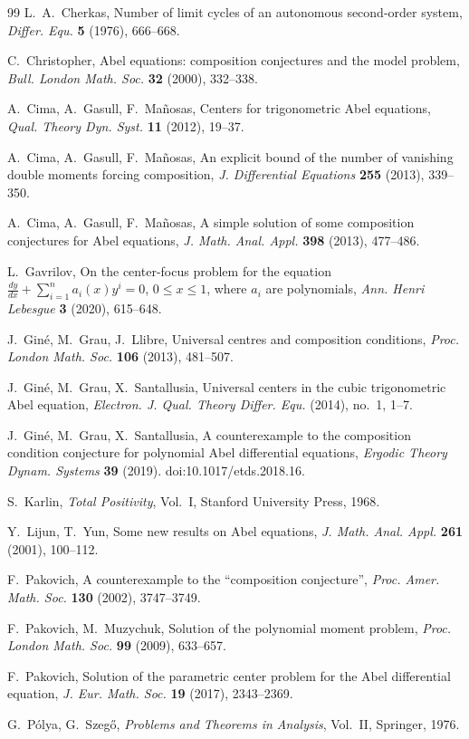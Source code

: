 \documentclass[11pt]{article}
\theoremstyle{plain}
\theoremstyle{definition}
\theoremstyle{remark}
\begin{document}
\begin{thebibliography}{99}
L.~A.~Cherkas,
Number of limit cycles of an autonomous second-order system,
\emph{Differ. Equ.} \textbf{5} (1976), 666--668.

C.~Christopher,
Abel equations: composition conjectures and the model problem,
\emph{Bull. London Math. Soc.} \textbf{32} (2000), 332--338.

A.~Cima, A.~Gasull, F.~Mañosas,
Centers for trigonometric Abel equations,
\emph{Qual. Theory Dyn. Syst.} \textbf{11} (2012), 19--37.

A.~Cima, A.~Gasull, F.~Mañosas,
An explicit bound of the number of vanishing double moments forcing composition,
\emph{J. Differential Equations} \textbf{255} (2013), 339--350.

A.~Cima, A.~Gasull, F.~Mañosas,
A simple solution of some composition conjectures for Abel equations,
\emph{J. Math. Anal. Appl.} \textbf{398} (2013), 477--486.

L.~Gavrilov,
On the center-focus problem for the equation
$\frac{dy}{dx}+\sum_{i=1}^n a_i(x)y^i=0$, $0\le x\le1$, where $a_i$ are polynomials,
\emph{Ann. Henri Lebesgue} \textbf{3} (2020), 615--648.

J.~Giné, M.~Grau, J.~Llibre,
Universal centres and composition conditions,
\emph{Proc. London Math. Soc.} \textbf{106} (2013), 481--507.

J.~Giné, M.~Grau, X.~Santallusia,
Universal centers in the cubic trigonometric Abel equation,
\emph{Electron. J. Qual. Theory Differ. Equ.} (2014), no.~1, 1--7.

J.~Giné, M.~Grau, X.~Santallusia,
A counterexample to the composition condition conjecture for polynomial Abel
differential equations,
\emph{Ergodic Theory Dynam. Systems} \textbf{39} (2019).
doi:10.1017/etds.2018.16.

S.~Karlin,
\emph{Total Positivity}, Vol.~I, Stanford University Press, 1968.

Y.~Lijun, T.~Yun,
Some new results on Abel equations,
\emph{J. Math. Anal. Appl.} \textbf{261} (2001), 100--112.

F.~Pakovich,
A counterexample to the ``composition conjecture'',
\emph{Proc. Amer. Math. Soc.} \textbf{130} (2002), 3747--3749.

F.~Pakovich, M.~Muzychuk,
Solution of the polynomial moment problem,
\emph{Proc. London Math. Soc.} \textbf{99} (2009), 633--657.

F.~Pakovich,
Solution of the parametric center problem for the Abel differential equation,
\emph{J. Eur. Math. Soc.} \textbf{19} (2017), 2343--2369.

G.~Pólya, G.~Szegő,
\emph{Problems and Theorems in Analysis}, Vol.~II, Springer, 1976.

\end{thebibliography}
\end{document}
